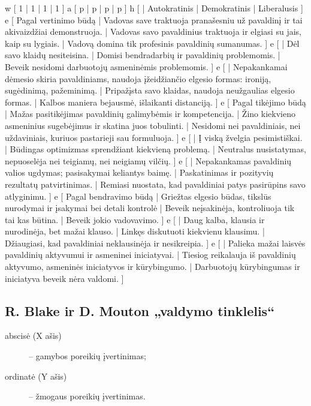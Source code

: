 \xtable
{
  w [ 1 | 1 | 1 | 1 ]
  a [ p | p | p | p ]
  h [ | Autokratinis | Demokratinis | Liberalusis ]
  e [ Pagal vertinimo būdą
    | Vadovas save traktuoja pranašesniu už pavaldinį ir tai akivaizdžiai 
      demonstruoja.
    | Vadovas savo pavaldinius traktuoja ir elgiasi su jais, kaip su
      lygiais.
    | Vadovą domina tik profesinis pavaldinių sumanumas. ]
  e [
    | Dėl savo klaidų nesiteisina.
    | Domisi bendradarbių ir pavaldinių problemomis.
    | Beveik nesidomi darbuotojų asmeninėmis problemomis. ]
  e [
    | Nepakankamai dėmesio skiria pavaldiniams, naudoja
      įžeidžiančio elgesio  formas: ironiją, sugėdinimą,
      pažeminimą.
    | Pripažįsta savo klaidas, naudoja neužgaulias elgesio formas.
    | Kalbos maniera bejausmė, išlaikanti distanciją. ]
  e [ Pagal tikėjimo būdą
    | Mažas pasitikėjimas pavaldinių galimybėmis ir kompetencija.
    | Žino kiekvieno asmeninius sugebėjimus ir skatina juos tobulinti.
    | Nesidomi nei pavaldiniais, nei uždaviniais, kuriuos pastarieji sau
      formuluoja.
    ]
  e [
    | Į viską žvelgia pesimistiškai.
    | Būdingas optimizmas sprendžiant kiekvieną problemą.
    | Neutralus nusistatymas, nepuoselėja nei teigiamų, nei neigiamų
      vilčių. ]
  e [
    | Nepakankamas pavaldinių valios ugdymas; pasisakymai keliantys baimę.
    | Paskatinimas ir pozityvių rezultatų patvirtinimas.
    | Remiasi nuostata, kad pavaldiniai patys pasirūpins savo atlyginimu.
    ]
  e [ Pagal bendravimo būdą
    | Griežtas elgesio būdas, tikslūs nurodymai ir įsakymai bei detali
      kontrolė
    | Beveik neįsakinėja, kontroliuoja tik tai kas būtina.
    | Beveik jokio vadovavimo.
    ]
  e [
    | Daug kalba, klausia ir nurodinėja, bet mažai klauso.
    | Linkęs diskutuoti kiekvienu klausimu.
    | Džiaugiasi, kad pavaldiniai neklausinėja ir nesikreipia.
    ]
  e [
    | Palieka mažai laisvės pavaldinių aktyvumui ir asmeninei iniciatyvai.
    | Tiesiog reikalauja  iš pavaldinių aktyvumo, asmeninės iniciatyvos ir
      kūrybingumo.
    | Darbuotojų kūrybingumas ir iniciatyva beveik nėra valdomi.
    ]
}

\subsection{R. Blake ir D. Mouton „valdymo tinklelis“}

\begin{description}
  \item[abscisė (X ašis)] – gamybos poreikių įvertinimas;
  \item[ordinatė (Y ašis)] – žmogaus poreikių įvertinimas.
\end{description}

